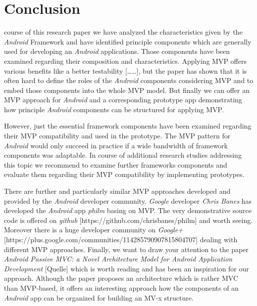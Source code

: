 \section{Conclusion}

 course of this research paper we have analyzed the characteristics given by the \emph{Android} Framework and have identified 
principle components which are generally used for developing an \emph{Android} applications. Those components have been examined regarding their composition and characteristics. 
Applying MVP offers various benefits like a better testability [……], but the paper has shown that it is often hard to define the roles 
of the \emph{Android} components considering MVP and to embed those components into the whole MVP model. But finally we can offer an MVP approach 
for \emph{Android} and a corresponding prototype app demonstrating how principle \emph{Android} components can be structured for applying MVP.
	
However, just the essential framework components have been examined regarding their MVP compatibility and used in the prototype. 
The MVP pattern for \emph{Android} would only succeed in practice if a wide bandwidth of framework components was adaptable. 
In course of additional research studies addressing this topic we recommend to examine further frameworks components and 
evaluate them regarding their MVP compatibility by implementing prototypes.

There are further and particularly similar MVP approaches developed and provided by the \emph{Android} developer community. 
\emph{Google} developer \emph{Chris Banes} has developed the \emph{Android} app \emph{philm} basing on MVP. 
The very demonstrative source code is offered on \emph{github} [https://github.com/chrisbanes/philm] and worth seeing. 
Moreover there is a huge developer community on \emph{Google+} [https://plus.google.com/communities/114285790907815804707] dealing with different MVP approaches. 
Finally, we want to draw your attention to the paper \emph{Android Passive MVC: a Novel Architecture Model for Android Application Development} 
[Quelle] which is worth reading and has been an inspiration for our approach. Although the paper proposes an architecture which is rather MVC than MVP-based, 
it offers an interesting approach how the components of an \emph{Android} app can be organized for building an MV-x structure. 